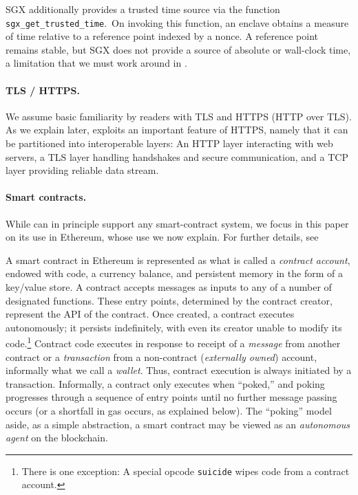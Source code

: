 SGX additionally provides a trusted time source via the function \texttt{sgx\_get\_trusted\_time}.~On invoking this function, an enclave obtains a measure of time relative to a reference point indexed by a nonce. A reference point remains stable, but SGX does not provide a source of absolute or wall-clock time, a limitation that we must work around in \tc.

\paragraph{\bf TLS / HTTPS.}
We assume basic familiarity by readers with TLS and HTTPS (HTTP over TLS). As we explain later, \tc exploits an important feature of HTTPS, namely that it can be partitioned into interoperable layers: An HTTP layer interacting with web servers, a TLS layer handling handshakes and secure communication, and a TCP layer providing reliable data stream. 

\paragraph{\bf Smart contracts.}
\label{sec:contracts-and-gas}
While \tc can in principle support any smart-contract system, we focus in this paper on its use in Ethereum, whose use we now explain. For further details, see~\cite{whitepaper,yellowpaper}

A smart contract in Ethereum is represented as what is called a \emph{contract account}, endowed with code, a currency balance, and persistent memory in the form of a key/value store. A contract accepts messages as inputs to any of a number of designated functions. These entry points, determined by the contract creator, represent the API of the contract. Once created, a contract executes autonomously; it persists indefinitely, with even its creator unable to modify its code.\footnote{There is one exception: A special opcode \texttt{suicide} wipes code from a contract account.} Contract code executes in response to receipt of a \emph{message} from another contract or a \emph{transaction} from a non-contract (\emph{externally owned}) account, informally what we call a \emph{wallet}. Thus, contract execution is always initiated by a transaction. Informally, a contract only executes when ``poked,'' and poking progresses through a sequence of entry points until no further message passing occurs (or a shortfall in gas occurs, as explained below). The ``poking'' model aside, as a simple abstraction, a smart contract may be viewed as an {\em autonomous agent} on the blockchain.

